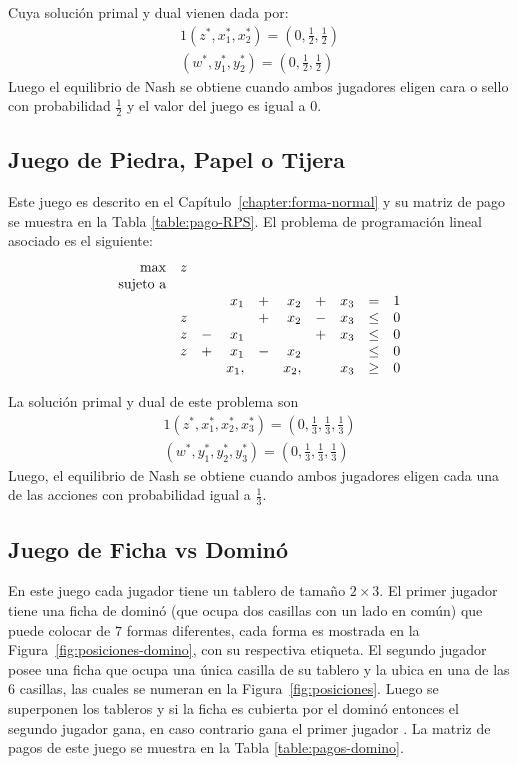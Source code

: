 Cuya solución primal y dual vienen dada por:
\begin{alignat}{1}
(z^*, x_1^*, x_2^*) = \left(0, \frac{1}{2}, \frac{1}{2} \right) \\
(w^*, y^*_1, y^*_2) = \left(0, \frac{1}{2}, \frac{1}{2} \right)
\end{alignat}
 Luego el equilibrio de Nash se obtiene cuando ambos jugadores eligen cara o sello con probabilidad $\frac{1}{2}$ y el valor del juego es igual a $0$.

\subsection*{Juego de Piedra, Papel o Tijera}

Este juego es descrito en el Capítulo~\ref{chapter:forma-normal} y su matriz de pago se muestra en la Tabla \ref{table:pago-RPS}. El problema de programación lineal asociado es el siguiente:
\begin{equation}
\begin{array}{r r r r r r r r r r}
\max  & z &  & & & & &\\
\text{sujeto a} \\  
&   &   & x_1  & + & x_2  & + & x_3 & =    & 1 \\
& z &   &      & + & x_2  & - & x_3 & \leq & 0 \\
& z & - & x_1  &   &      & + & x_3 & \leq & 0 \\
& z & + & x_1  & - & x_2  &   &     & \leq & 0 \\
&   &   & x_1, &   & x_2, &   & x_3 & \geq & 0
\end{array}
\end{equation}

La solución primal y dual de este problema son
\begin{alignat}{1}
(z^*, x_1^*, x_2^*, x_3^*) = \left(0, \frac{1}{3}, \frac{1}{3}, \frac{1}{3}\right) \\
(w^*, y_1^*, y_2^*, y_3^*) = \left(0, \frac{1}{3}, \frac{1}{3}, \frac{1}{3}\right)
\end{alignat}
Luego, el equilibrio de Nash se obtiene cuando ambos jugadores eligen cada una de las acciones con probabilidad igual a $\frac{1}{3}$.

\subsection*{Juego de Ficha vs Dominó}

En este juego cada jugador tiene un tablero de tamaño $2\times 3$. El primer jugador tiene una ficha de dominó (que ocupa dos casillas con un lado en común) que puede colocar de $7$ formas diferentes, cada forma es mostrada en la Figura~\ref{fig:posiciones-domino}, con su respectiva etiqueta. El segundo jugador posee una ficha que ocupa una única casilla de su tablero y la ubica en una de las $6$ casillas, las cuales se numeran en la Figura~\ref{fig:posiciones}. Luego se superponen los tableros y si la ficha es cubierta por el dominó entonces el segundo jugador gana, en caso contrario gana el primer jugador \cite[p. 237]{bib:pl-chvatal}. La matriz de pagos de este juego se muestra en la Tabla \ref{table:pagos-domino}.

